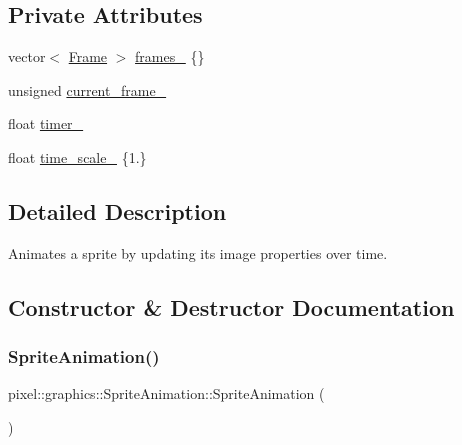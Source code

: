 \subsection*{Private Attributes}
\begin{DoxyCompactItemize}
\item 
vector$<$ \hyperlink{structpixel_1_1graphics_1_1_sprite_animation_1_1_frame}{Frame} $>$ \hyperlink{classpixel_1_1graphics_1_1_sprite_animation_a2c6bac7e623282b62ca07d4920785fcd}{frames\+\_\+} \{\}
\item 
unsigned \hyperlink{classpixel_1_1graphics_1_1_sprite_animation_aaf052623c8f72272078a833c46f28437}{current\+\_\+frame\+\_\+}
\item 
float \hyperlink{classpixel_1_1graphics_1_1_sprite_animation_abd9331bdc0e420dd1f15ff9c276413b3}{timer\+\_\+}
\item 
float \hyperlink{classpixel_1_1graphics_1_1_sprite_animation_a2e92d405501b311c448f4580b44ef2a1}{time\+\_\+scale\+\_\+} \{1.\}
\end{DoxyCompactItemize}


\subsection{Detailed Description}
Animates a sprite by updating its image properties over time. 

\subsection{Constructor \& Destructor Documentation}
\mbox{\label{classpixel_1_1graphics_1_1_sprite_animation_ab1c074091cc2bd6bea22a8a953b56147}} 
\subsubsection{\texorpdfstring{Sprite\+Animation()}{SpriteAnimation()}}
{\footnotesize\ttfamily pixel\+::graphics\+::\+Sprite\+Animation\+::\+Sprite\+Animation (\begin{DoxyParamCaption}{ }\end{DoxyParamCaption})\hspace{0.3cm}{\ttfamily [default]}}



